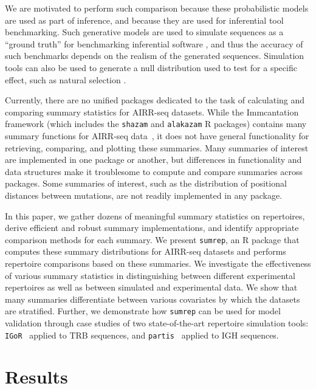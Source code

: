 \documentclass{article}
\newcommand{\partis}{\texttt{partis}}
\newcommand{\igor}{\texttt{IGoR}}
\begin{document}
We are motivated to perform such comparison because these probabilistic models are used as part of inference, and because they are used for inferential tool benchmarking.
Such generative models are used to simulate sequences as a ``ground truth'' for benchmarking inferential software \cite{Ralph2016-iz,Gupta2017-ve,Marcou2018-du}, and thus the accuracy of such benchmarks depends on the realism of the generated sequences.
Simulation tools can also be used to generate a null distribution used to test for a specific effect, such as natural selection \cite{Yaari2012-kk}.

Currently, there are no unified packages dedicated to the task of calculating and comparing summary statistics for AIRR-seq datasets.
While the Immcantation framework (which includes the \texttt{shazam} and \texttt{alakazam} R packages) contains many summary functions for AIRR-seq data~\cite{Gupta2015-iu}, it does not have general functionality for retrieving, comparing, and plotting these summaries.
Many summaries of interest are implemented in one package or another, but differences in functionality and data structures make it troublesome to compute and compare summaries across packages.
Some summaries of interest, such as the distribution of positional distances between mutations, are not readily implemented in any package.

In this paper, we gather dozens of meaningful summary statistics on repertoires, derive efficient and robust summary implementations, and identify appropriate comparison methods for each summary.
We present \texttt{sumrep}, an R package that computes these summary distributions for AIRR-seq datasets and performs repertoire comparisons based on these summaries.
We investigate the effectiveness of various summary statistics in distinguishing between different experimental repertoires as well as between simulated and experimental data. We show that many summaries differentiate between various covariates by which the datasets are stratified.
Further, we demonstrate how \texttt{sumrep} can be used for model validation through case studies of two state-of-the-art repertoire simulation tools: \igor~\cite{Marcou2018-du} applied to TRB sequences, and \partis~\cite{Ralph2016-nw, Ralph2016-iz} applied to IGH sequences.


\section*{Results}
\end{document}
